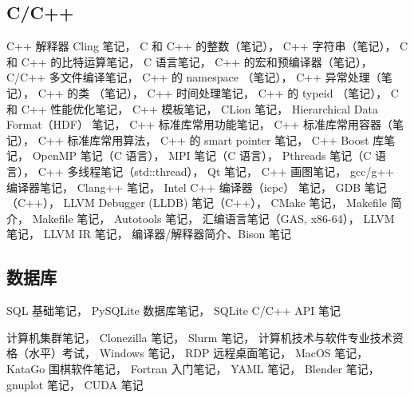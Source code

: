 \subsection{C/C++}
C++ 解释器 Cling 笔记，
C 和 C++ 的整数（笔记），
C++ 字符串（笔记），
C 和 C++ 的比特运算笔记，
C 语言笔记，
C++ 的宏和预编译器（笔记），
C/C++ 多文件编译笔记，
C++ 的 namespace （笔记），
C++ 异常处理（笔记），
C++ 的类 （笔记），
C++ 时间处理笔记，
C++ 的 typeid （笔记），
C 和 C++ 性能优化笔记，
C++ 模板笔记，
CLion 笔记，
Hierarchical Data Format（HDF） 笔记，
C++ 标准库常用功能笔记，
C++ 标准库常用容器（笔记），
C++ 标准库常用算法，
C++ 的 smart pointer 笔记，
C++ Boost 库笔记，
OpenMP 笔记（C 语言），
MPI 笔记（C 语言），
Pthreads 笔记（C 语言），
C++ 多线程笔记（std::thread），
Qt 笔记，
C++ 画图笔记，
gcc/g++ 编译器笔记，
Clang++ 笔记，
Intel C++ 编译器（icpc） 笔记，
GDB 笔记（C++），
LLVM Debugger (LLDB) 笔记（C++），
CMake 笔记，
Makefile 简介，
Makefile 笔记，
Autotools 笔记，
汇编语言笔记（GAS, x86-64），
LLVM 笔记，
LLVM IR 笔记，
编译器/解释器简介、Bison 笔记

\subsection{数据库}
SQL 基础笔记，
PySQLite 数据库笔记，
SQLite C/C++ API 笔记

计算机集群笔记，
Clonezilla 笔记，
Slurm 笔记，
计算机技术与软件专业技术资格（水平）考试，
Windows 笔记，
RDP 远程桌面笔记，
MacOS 笔记，
KataGo 围棋软件笔记，
Fortran 入门笔记，
YAML 笔记，
Blender 笔记，
gnuplot 笔记，
CUDA 笔记

